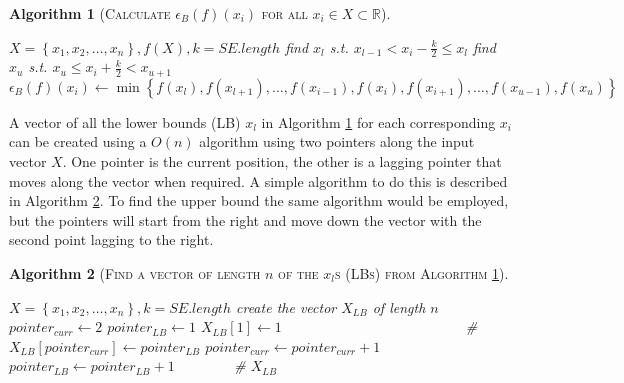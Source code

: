 \documentclass[12pt,a4paper,oneside]{report}
\newtheorem{algprop}{Algorithm}[chapter]
\def\balg#1{\begin{algprop}[\scshape{#1}]\mbox{}}
\def\ealg{\end{algprop}}
\begin{document}
\begin{appendix}
%      
 
\balg{Calculate $\epsilon_B (f) (x_i)$ for all $x_i \in X \subset \mathds{R}$} \label{alg1}                
\begin{algorithmic}                    
\REQUIRE $X= \left\{x_1,x_2,\ldots,x_n \right\}, f(X), k=SE.length$
\STATE find $x_l$ s.t. $x_{l-1} < x_i-\frac{k}{2} \leq x_l$
\STATE find $x_u$ s.t. $x_{u} \leq x_i+\frac{k}{2} < x_{u+1}$
\STATE $\epsilon_B (f) (x_i) \gets  \min \left\{ f( x_{l}), f(x_{l+1}), \dots, f(x_{i-1}), f(x_i), f(x_{i+1}), \ldots, f(x_{u-1}), f(x_u) \right\}$
\ENDFOR
\end{algorithmic}
\ealg


 
A vector of all the lower bounds (LB) $x_l$ in Algorithm \ref{alg1} for each corresponding $x_i$ can be created using a $O (n)$ algorithm using two pointers along the input vector $X$. One pointer is the current position, the other is a lagging pointer that moves along the vector when required. A simple algorithm to do this is described in Algorithm \ref{alg2}. To find the upper bound the same algorithm would be employed, but the pointers will start from the right and move down the vector with the second point lagging to the right.\\[15pt]


                     
\balg{Find a vector of length $n$ of the $x_l$s (LBs) from Algorithm \ref{alg1}}         
\label{alg2}                           
\begin{algorithmic}                    
\REQUIRE $X= \left\{x_1,x_2,\ldots,x_n \right\}, k=SE.length$
\STATE create the vector $X_{LB}$ of length $n$
\STATE $pointer_{curr} \gets 2$
\STATE $pointer_{LB} \gets 1$
\STATE $X_{LB} \left[ 1 \right] \gets 1 \; \; \; \; \; \; \; \; \; \; \; \; \; \; \; \; \; \; \; \; \; \; \; \; \; \; \; \; \; \;  \; \; \; \; \; \; \; \; \; \; \; \;  \; \; \; \; $ \# 
\STATE $X_{LB} \left[ pointer_{curr} \right] \gets pointer_{LB} $
\STATE $pointer_{curr}  \gets pointer_{curr} + 1$
\ELSE
\STATE $pointer_{LB}  \gets pointer_{LB} + 1 \; \; \; \; \; \; \; \; \; \; \; \; \; \; $ \# 
\ENDIF
\ENDWHILE
\RETURN $X_{LB}$
\end{algorithmic}
\ealg


\end{appendix}
\end{document}
